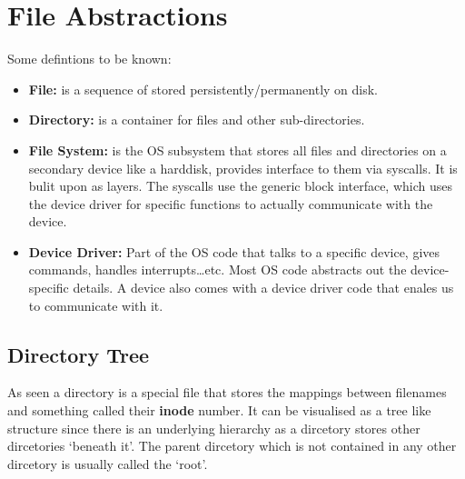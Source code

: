 \documentclass[12pt]{article}
\begin{document}



\section{File Abstractions}

Some defintions to be known:
\begin{itemize}[topsep = 0cm, parsep = 0cm, itemsep = 0cm]
    \item\textbf{File:} is a sequence of stored persistently/permanently on disk.
    \item \textbf{Directory:} is a container for files and other sub-directories. 
    \item \textbf{File System:} is the OS subsystem that stores all files and directories on a secondary device like a harddisk, provides interface to them via syscalls. It is bulit upon as layers. The syscalls use the generic block interface, which uses the device driver for specific functions to actually communicate with the device.
    \item \textbf{Device Driver:} Part of the OS code that talks to a specific device, gives commands, handles interrupts\ldots etc. Most OS code abstracts out the 
    device-specific details. A device also comes with a device driver code that enales us to communicate with it. 
\end{itemize}

\subsection{Directory Tree}
As seen a directory is a special file that stores the mappings between filenames and something called their \textbf{inode} number. 
It can be visualised as a tree like structure since there is an underlying hierarchy as a dircetory stores other dircetories `beneath it'.
The parent dircetory which is not contained in any other dircetory is usually called the `root'.
\end{document}
